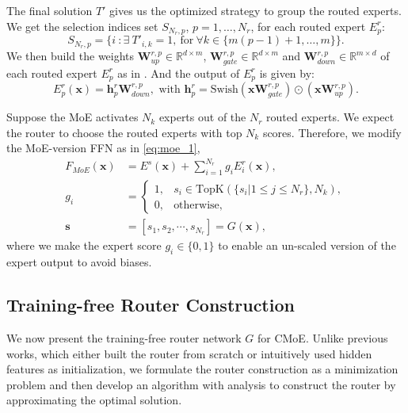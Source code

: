The final solution $T'$ gives us the optimized strategy to group the routed experts. We get the selection indices set $S_{N_r,p}$, $p = 1, \dots, N_r$, for each routed expert $E^{r}_{p}$:
\begin{equation*}
    S_{N_r,p} =\{ i\ : \exists \ T'_{i,k} = 1, \ \text{for} \ \forall k \in \{m(p-1)+1,\dots,m\}  \}.
\end{equation*} 
We then build the weights $\mathbf{W}_{up}^{r,p} \in \mathbb{R}^{d\times m}$, $\mathbf{W}_{gate}^{r,p} \in \mathbb{R}^{d\times m}$ and $\mathbf{W}_{down}^{r,p} \in \mathbb{R}^{m \times d}$ of each routed expert $E_{p}^{r}$ as in .
And the output of $E_{p}^{r}$ is given by:
\begin{equation*}
     E^{r}_{p}(\mathbf{x}) \!=\! \mathbf{h}^{r}_{p}\mathbf{W}_{down}^{r,p}, \mbox{ with }
     \mathbf{h}^{r}_{p}  \!=\! \text{Swish} (\mathbf{x}\mathbf{W}_{gate}^{r,p}) \odot (\mathbf{x}\mathbf{W}_{up}^{r,p}).
\end{equation*}

Suppose the MoE activates $N_k$ experts out of the $N_r$ routed experts. We expect the router to choose the routed experts with top $N_k$ scores.
Therefore, we modify the MoE-version FFN as in \eqref{eq:moe_1},
\begin{align}
\label{eq:moe_1}
    F_{MoE}(\mathbf{x}) &= E^s(\mathbf{x}) + \sum^{N_r}_{i=1} g_i E_i^{r}(\textbf{x}), \nonumber \\
    g_i &= \left\{ \begin{array}{rl}
        1, &s_i \in \text{TopK}(\{s_i | 1\leq j\leq N_r\}, N_k),  \\ 
        0, & \text{otherwise},
    \end{array}\right. \nonumber \\
    \textbf{s} &= \left[s_1,s_2,\cdots, s_{N_r}\right] = G(\textbf{x}),
\end{align}
where we make the expert score $g_i\in \{0,1\}$ to enable an un-scaled version of the expert output to avoid biases.

\subsection{Training-free Router Construction}
\label{sec:router_cons}

We now present the training-free router network $G$ for CMoE.
Unlike previous works, which either built the router from scratch or intuitively used hidden features as initialization, we formulate the router construction as a minimization problem and then develop an algorithm with analysis to construct the router by approximating the optimal solution.


